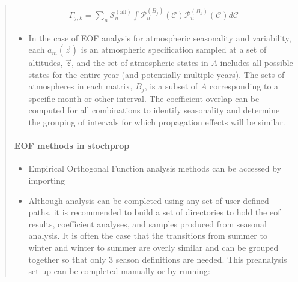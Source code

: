 \documentclass[letterpaper,10pt,english]{sphinxmanual}
\begin{document}
\begin{itemize}
\begin{quote}
\begin{itemize}
\end{itemize}
\begin{equation*}
\begin{split}\Gamma_{j,k}  =  \sum_n{ \mathcal{S}_n^{(\text{all})} \int{\mathcal{P}_n^{(B_j)} \left( \mathcal{C} \right) \mathcal{P}_n^{(B_k)} \left( \mathcal{C} \right) d \mathcal{C} }}\end{split}
\end{equation*}\begin{itemize}
\item {} 
\sphinxAtStartPar
In the case of EOF analysis for atmospheric seasonality and variability, each \(a_m(\vec{z})\) is an atmospheric specification sampled at a set of altitudes, \(\vec{z}\), and the set of atmospheric states in \(A\) includes all possible states for the entire year (and potentially multiple years).  The sets of atmospheres in each matrix, \(B_j\), is a subset of \(A\) corresponding to a specific month or other interval.  The coefficient overlap can be computed for all combinations to identify seasonality and determine the grouping of intervals for which propagation effects will be similar.

\end{itemize}


\paragraph{EOF methods in stochprop}
\label{\detokenize{eofs:eof-methods-in-stochprop}}\begin{itemize}
\item {} 
\sphinxAtStartPar
Empirical Orthogonal Function analysis methods can be accessed by importing 

\item {} 
\sphinxAtStartPar
Although analysis can be completed using any set of user defined paths, it is recommended to build a set of directories to hold the eof results, coefficient analyses, and samples produced from seasonal analysis.  It is often the case that the transitions from summer to winter and winter to summer are overly similar and can be grouped together so that only 3 season definitions are needed.  This pre\sphinxhyphen{}analysis set up can be completed manually or by running:

\end{itemize}

\begin{sphinxVerbatim}[commandchars=\\\{\}]
 
 
   


\end{sphinxVerbatim}
\end{quote}
\end{itemize}
\end{document}
